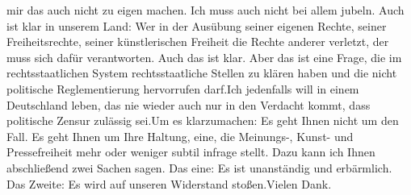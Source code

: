 \documentclass{article}
\begin{document}
mir das auch nicht zu eigen machen. Ich muss auch nicht bei allem jubeln. Auch ist klar in unserem Land: Wer in der Ausübung seiner eigenen Rechte, seiner Freiheitsrechte, seiner künstlerischen Freiheit die Rechte anderer verletzt, der muss sich dafür verantworten. Auch das ist klar. Aber das ist eine Frage, die im rechtsstaatlichen System rechtsstaatliche Stellen zu klären haben und die nicht politische Reglementierung hervorrufen darf.Ich jedenfalls will in einem Deutschland leben, das nie wieder auch nur in den Verdacht kommt, dass politische Zensur zulässig sei.Um es klarzumachen: Es geht Ihnen nicht um den Fall. Es geht Ihnen um Ihre Haltung, eine, die Meinungs-, Kunst- und Pressefreiheit mehr oder weniger subtil infrage stellt. Dazu kann ich Ihnen abschließend zwei Sachen sagen. Das eine: Es ist unanständig und erbärmlich. Das Zweite: Es wird auf unseren Widerstand stoßen.Vielen Dank.
\end{document}
